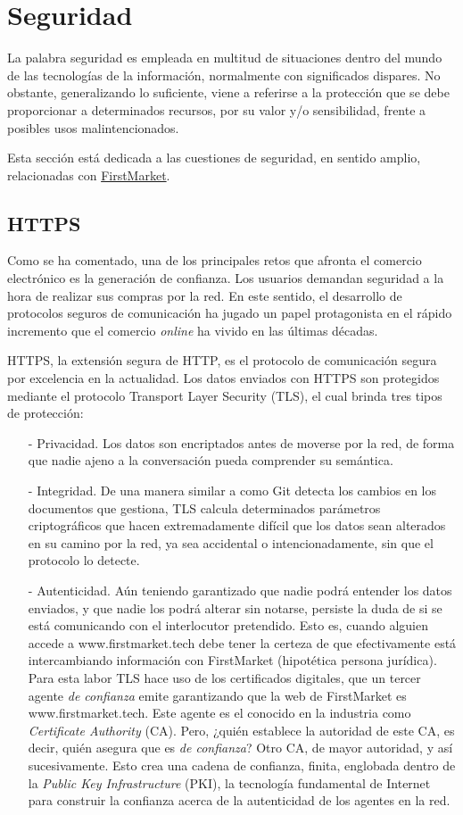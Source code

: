\documentclass[a4paper]{article}
\begin{document}
	\section{Seguridad}
	La palabra seguridad es empleada en multitud de situaciones dentro del mundo de las tecnologías de la información, normalmente con significados dispares. No obstante, generalizando lo suficiente, viene a referirse a la protección que se debe proporcionar a determinados recursos, por su valor y/o sensibilidad, frente a posibles usos malintencionados.
	
	Esta sección está dedicada a las cuestiones de seguridad, en sentido amplio, relacionadas con \href{https://firstmarket.tech}{FirstMarket}.
	\subsection{HTTPS} \label{sec:https}
	Como se ha comentado, una de los principales retos que afronta el comercio electrónico es la generación de confianza. Los usuarios demandan seguridad a la hora de realizar sus compras por la red. En este sentido, el desarrollo de protocolos seguros de comunicación ha jugado un papel protagonista en el rápido incremento que el comercio \emph{online} ha vivido en las últimas décadas.
	
	HTTPS, la extensión segura de HTTP, es el protocolo de comunicación segura por excelencia en la actualidad. Los datos enviados con HTTPS son protegidos mediante el protocolo Transport Layer Security (TLS), el cual brinda tres tipos de protección:
	
		\begin{itemize}
			\item[-] Privacidad. Los datos son encriptados antes de moverse por la red, de forma que nadie ajeno a la conversación pueda comprender su semántica.
			\item[-] Integridad. De una manera similar a como Git detecta los cambios en los documentos que gestiona, TLS calcula determinados parámetros criptográficos que hacen extremadamente difícil que los datos sean alterados en su camino por la red, ya sea accidental o intencionadamente, sin que el protocolo lo detecte.
			\item[-] Autenticidad. Aún teniendo garantizado que nadie podrá entender los datos enviados, y que nadie los podrá alterar sin notarse, persiste la duda de si se está comunicando con el interlocutor pretendido. Esto es, cuando alguien accede a www.firstmarket.tech debe tener la certeza de que efectivamente está intercambiando información con FirstMarket (hipotética persona jurídica). Para esta labor TLS hace uso de los certificados digitales, que un tercer agente \emph{de confianza} emite garantizando que la web de FirstMarket es www.firstmarket.tech. Este agente es el conocido en la industria como \emph{Certificate Authority} (CA). Pero, ¿quién establece la autoridad de este CA, es decir, quién asegura que es \emph{de confianza}? Otro CA, de mayor autoridad, y así sucesivamente. Esto crea una cadena de confianza, finita, englobada dentro de la \emph{Public Key Infrastructure} (PKI), la tecnología fundamental de Internet para construir la confianza acerca de la autenticidad de los agentes en la red.
		\end{itemize}
	
\end{document}
